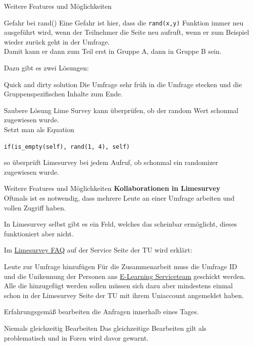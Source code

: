 \documentclass[aspectratio=1610, 9pt]{beamer}
\begin{document}
\begin{frame}
	{Weitere Features und Möglichkeiten}
	\begin{alertblock}{Gefahr bei rand()}
		Eine Gefahr ist hier, dass die \texttt{rand(x,y)} Funktion immer neu
		ausgeführt wird, wenn der Teilnehmer die Seite neu aufruft, wenn er zum
		Beispiel wieder zurück geht in der Umfrage.
		\\
		Damit kann er dann zum Teil erst in Gruppe A, dann in Gruppe B sein.
	\end{alertblock}
	\medskip
	Dazu gibt es zwei Lösungen:
	\begin{block}{Quick and dirty solution}
		Die Umfrage sehr früh in die Umfrage stecken und die Gruppenspezifischen
		Inhalte zum Ende.
	\end{block}
	\medskip
	\begin{block}{Saubere Lösung}
		Lime Survey kann überprüfen, ob der random Wert schonmal zugewiesen wurde.
		\\
		Setzt man als Equation
		\begin{center}
			\texttt{if(is\_empty(self), rand(1, 4), self)}
		\end{center}
		so überprüft Limesurvey bei jedem Aufruf, ob schonmal ein randomizer
		zugewiesen wurde.
	\end{block}
\end{frame}

\begin{frame}
	{Weitere Features und Möglichkeiten}
	\textbf{Kollaborationen in Limesurvey}
	\\
	Oftmals ist es notwendig, dass mehrere Leute an einer Umfrage arbeiten
	und vollen Zugriff haben.

	In Limesurvey selbst gibt es ein Feld, welches das scheinbar ermöglicht,
	dieses \alert{funktioniert aber nicht}.

	Im
	\href{https://service.tu-dortmund.de/group/intra/faq-limesurvey1}{Limesurvey
	FAQ} auf der Service Seite der TU wird erklärt:
	\begin{block}
		{Leute zur Umfrage hinzufügen}
		Für die Zusammenarbeit muss die Umfrage ID und die Unikennung der
		Personen ans \href{mailto:service.itmc@tu-dortmund.de}{E-Learning
		Serviceteam} geschickt werden. Alle die hinzugefügt werden sollen müssen
		sich dazu aber mindestens einmal schon in der Limesurvey Seite der TU mit
		ihrem Uniaccount angemeldet haben.

		Erfahrungsgemäß bearbeiten die Anfragen innerhalb eines Tages.
	\end{block}
	\begin{alertblock}
		{Niemals gleichzeitig Bearbeiten}
		Das gleichzeitige Bearbeiten gilt als problematisch und in Foren wird
		davor gewarnt.
	\end{alertblock}
\end{frame}
\end{document}
